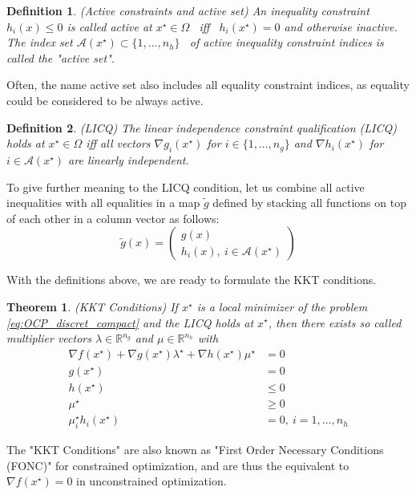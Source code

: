 \documentclass  [
  paper    = a4,
  BCOR     = 10mm,
  twoside,
  fontsize = 12pt,
  fleqn,
  toc      = bibnumbered,
  toc      = listofnumbered,
  numbers  = noendperiod,
  headings = normal,
  listof   = leveldown,
  version  = 3.03
]                                       {scrreprt}
\newcommand{\<}{\langle}
\renewcommand{\>}{\rangle}
\newtheorem{theorem}{Theorem}
\newtheorem{definition}{Definition}
\begin{document}
\begin{definition}(Active constraints and active set) An inequality constraint $h_i(x) \leq 0$ is called active at $x^\star \in  \Omega$  iff  $h_i(x^\star) = 0$ and otherwise inactive. The index set $\mathcal{A}(x^\star) \subset \{1, ..., n_h\}$  of active inequality constraint indices is called the "active set".
\end{definition}
Often, the name active set also includes all equality constraint indices, as equality could be considered to be always active. 
\begin{definition} (LICQ) The linear independence constraint qualification (LICQ) holds at $x^\star \in  \Omega $ iff all vectors $\nabla g_i(x^\star)$ for $i \in \{1, ..., n_g \}$ and $\nabla h_i(x^\star)$ for  $i \in \mathcal{A}(x^\star)$ are linearly independent.
	\label{df_LICO}
\end{definition}
To give further meaning to the LICQ condition, let us combine all active inequalities with all equalities in a map $\tilde{g}$ defined by stacking all functions on top of each other in a column vector as follows:
\begin{equation}
	\tilde{g}(x) =  \begin{pmatrix} g(x) \\ h_i(x), \ i \in \mathcal{A}(x^\star)    \end{pmatrix}
\end{equation}


With the definitions above, we are ready to formulate the KKT conditions.
\begin{theorem}(KKT Conditions)
	If $x^\star$ is a local minimizer of the problem \ref{eq:OCP_discret_compact} and the LICQ holds at $x^\star$, then there exists
	so called multiplier vectors $\lambda \in \mathbb{R}^{n_g}$ and $\mu \in \mathbb{R}^{n_h}$ with 
	\begin{subequations}
		\begin{align}
			\nabla f(x^\star) + \nabla g(x^\star) \lambda^\star +  \nabla h(x^\star) \mu^\star &= 0 \\
			g(x^\star) &= 0   \\
			h(x^\star)&\leq 0  \label{kkt_smaller}\\
			\mu^\star & \geq 0 \\
			\mu_i^\star  h_i(x^\star) &=0 , \  i = 1, ..., n_h \label{kkt_active}
		\end{align}
	\end{subequations}
	\label{TH_KKT}
\end{theorem}
The "KKT Conditions" are also known as "First Order Necessary Conditions (FONC)" for constrained optimization, and are thus the equivalent to $\nabla f(x^\star)=0$ in unconstrained optimization.
\end{document}
